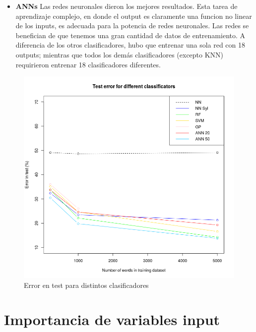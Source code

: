 \documentclass[paper=a4, fontsize=11pt]{scrartcl} %
\numberwithin{equation}{section} %
\numberwithin{figure}{section} %
\numberwithin{table}{section} %
\begin{document}
\begin{itemize}
\item \textbf{ANNs} Las redes neuronales dieron los mejores resultados. Esta tarea de aprendizaje complejo, en donde el output es claramente una funcion no linear de los inputs, es adecuada para la potencia de redes neuronales. Las redes se benefician de que tenemos una gran cantidad de datos de entrenamiento. A diferencia de los otros clasificadores, hubo que entrenar una sola red con 18 outputs; mientras que todos los demás clasificadores (excepto KNN) requirieron entrenar 18 clasificadores diferentes.

\end{itemize}



\begin{center}
\begin{figure}[h!]
\includegraphics[width=170mm]{imgs/figure.png}
\caption{Error en test para distintos clasificadores}
\label{fig:results}

\end{figure}
\end{center}

\newpage

\section{ Importancia de variables input}
\end{document}
